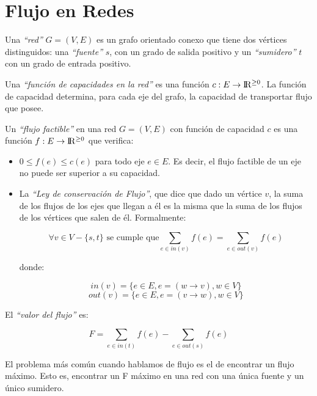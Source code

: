 \newpage
\section{Flujo en Redes}

Una \emph{``red''} $G = (V, E)$ es un grafo orientado conexo que tiene dos v\'ertices distinguidos: una \emph{``fuente''} $s$, con un grado de salida positivo y un \emph{``sumidero''} $t$ con un grado de entrada positivo.

Una \emph{``funci\'on de capacidades en la red''} es una funci\'on $c : E \rightarrow {\rm I\!R^{\geq 0}}$. La funci\'on de capacidad determina, para cada eje del grafo, la capacidad de transportar flujo que posee.

Un \emph{``flujo factible''} en una red $G = (V, E)$ con funci\'on de capacidad $c$ es una funci\'on $f : E \rightarrow {\rm I\!R^{\geq 0}}$ que verifica:

\begin{itemize}
\item $0 \leq f(e) \leq c(e)$ para todo eje $e \in E$. Es decir, el flujo factible de un eje no puede ser superior a su capacidad.
\item La \emph{``Ley de conservaci\'on de Flujo''}, que dice que dado un v\'ertice $v$, la suma de los flujos de los ejes que llegan a \'el es la misma que la suma de los flujos de los v\'ertices que salen de \'el. Formalmente:

\[
\forall v \in V - \{ s, t \} \textrm{ se cumple que} \sum_{e \in in(v)} f(e) = \sum_{e \in out(v)} f(e)
\]

donde:

\[
in(v) = \{ e \in E, e = (w \rightarrow v), w \in V \}
\]
\[
out(v) = \{ e \in E, e = (v \rightarrow w), w \in V \}
\]


\end{itemize}

El \emph{``valor del flujo''} es:

\[
F = \sum_{e \in in(t)} f(e) - \sum_{e \in out(s)} f(e)
\]


El problema m\'as com\'un cuando hablamos de flujo es el de encontrar un flujo m\'aximo. Esto es, encontrar un F m\'aximo en una red con una \'unica fuente y un \'unico sumidero.



